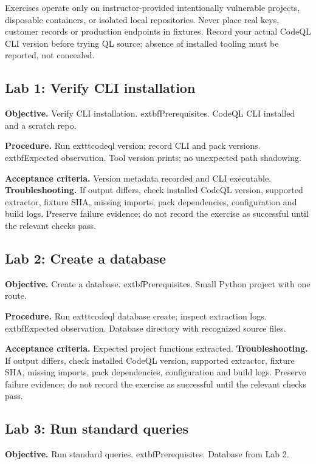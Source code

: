 \documentclass[11pt,letterpaper,oneside]{book}
\begin{document}
Exercises operate only on instructor-provided intentionally vulnerable projects, disposable containers, or isolated local repositories. Never place real keys, customer records or production endpoints in fixtures. Record your actual CodeQL CLI version before trying QL source; absence of installed tooling must be reported, not concealed.

\subsection{Lab 1: Verify CLI installation}

\textbf{Objective.} Verify CLI installation. 	extbf{Prerequisites.} CodeQL CLI installed and a scratch repo.

\textbf{Procedure.} Run 	exttt{codeql version}; record CLI and pack versions. 	extbf{Expected observation.} Tool version prints; no unexpected path shadowing.

\textbf{Acceptance criteria.} Version metadata recorded and CLI executable. \textbf{Troubleshooting.} If output differs, check installed CodeQL version, supported extractor, fixture SHA, missing imports, pack dependencies, configuration and build logs. Preserve failure evidence; do not record the exercise as successful until the relevant checks pass.

\subsection{Lab 2: Create a database}

\textbf{Objective.} Create a database. 	extbf{Prerequisites.} Small Python project with one route.

\textbf{Procedure.} Run 	exttt{codeql database create}; inspect extraction logs. 	extbf{Expected observation.} Database directory with recognized source files.

\textbf{Acceptance criteria.} Expected project functions extracted. \textbf{Troubleshooting.} If output differs, check installed CodeQL version, supported extractor, fixture SHA, missing imports, pack dependencies, configuration and build logs. Preserve failure evidence; do not record the exercise as successful until the relevant checks pass.

\subsection{Lab 3: Run standard queries}

\textbf{Objective.} Run standard queries. 	extbf{Prerequisites.} Database from Lab 2.
\end{document}
